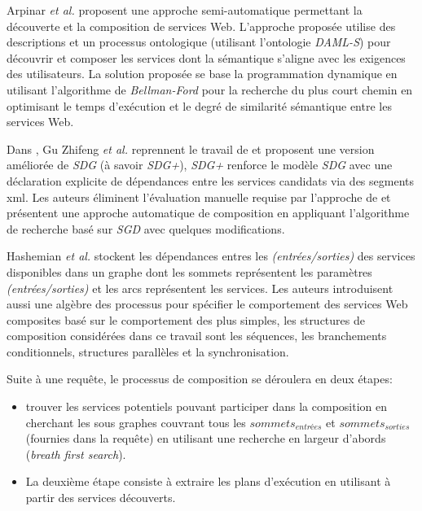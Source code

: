   Arpinar \textit{et al.} \cite{arpinar2005ontology} proposent une
  approche semi-automatique permettant la découverte et la composition
  de services Web. L'approche proposée utilise des descriptions et un
  processus ontologique (utilisant l'ontologie \textit{DAML-S}) pour
  découvrir et composer les services dont la sémantique s'aligne avec
  les exigences des utilisateurs. La solution proposée se base la
  programmation dynamique en utilisant l'algorithme de
  \textit{Bellman-Ford} pour la recherche du plus court chemin en
  optimisant le temps d'exécution et le degré de similarité sémantique
  entre les services Web.\bigskip

  Dans \cite{gu2008automatic}, Gu Zhifeng \textit{et al.} reprennent
  le travail de \cite{liang2005and} et proposent une version améliorée
  de \textit{SDG} (à savoir \textit{SDG+}), \textit{SDG+} renforce le
  modèle \textit{SDG} avec une déclaration explicite de dépendances
  entre les services candidats via des segments \acrshort{xml}. Les
  auteurs éliminent l'évaluation manuelle requise par l'approche de
  \cite{liang2005and} et présentent une approche automatique de
  composition en appliquant l'algorithme de recherche basé sur
  \textit{SGD} avec quelques modifications.\bigskip

  Hashemian \textit{et al.} \cite{hashemian2006graph} stockent les
  dépendances entres les \textit{(entrées/sorties)} des services
  disponibles dans un graphe dont les sommets représentent les
  paramètres \textit{(entrées/sorties)} et les arcs représentent les
  services. Les auteurs introduisent aussi une algèbre des processus
  pour spécifier le comportement des services Web composites basé sur
  le comportement des plus simples, les structures de composition
  considérées dans ce travail sont les séquences, les branchements
  conditionnels, structures parallèles et la synchronisation.

  Suite à une requête, le processus de composition se déroulera en
  deux étapes:

  \SpecialItem
  \begin{itemize}
  \item trouver les services potentiels pouvant participer dans la
    composition en cherchant les sous graphes couvrant tous les
    $sommets_{entrées}$ et $sommets_{sorties}$ (fournies dans la
    requête) en utilisant une recherche en largeur d'abords
    (\textit{breath first search}).

  \item La deuxième étape consiste à extraire les plans d'exécution en
    utilisant à partir des services découverts.\bigskip
  \end{itemize}

